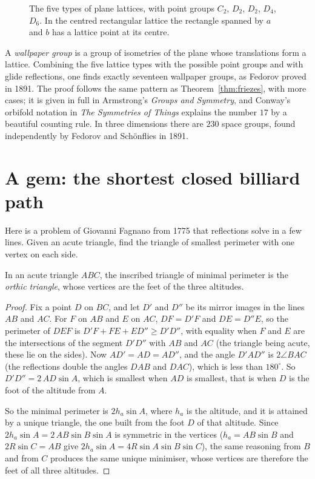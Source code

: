 \begin{figure}[ht]
\centering
{}
\caption{The five types of plane lattices, with point groups $C_2$, $D_2$, $D_2$, $D_4$, $D_6$. In the centred rectangular lattice the
rectangle spanned by $a$ and $b$ has a lattice point at its centre.}
\label{fig:lattices}
\end{figure}

\begin{remark}
A \emph{wallpaper group} is a group of isometries of the plane whose translations form a lattice. Combining the five lattice types with
the possible point groups and with glide reflections, one finds exactly seventeen wallpaper groups, as Fedorov proved in 1891. The proof
follows the same pattern as Theorem~\ref{thm:friezes}, with more cases; it is given in full in Armstrong's \emph{Groups and Symmetry}, and Conway's orbifold notation in \emph{The Symmetries of Things} explains the number $17$ by a beautiful counting rule. In
three dimensions there are $230$ space groups, found independently by Fedorov and Sch\"onflies in 1891.
\end{remark}

\section{A gem: the shortest closed billiard path}

Here is a problem of Giovanni Fagnano from 1775 that reflections solve in a few lines. Given an acute triangle, find the triangle of
smallest perimeter with one vertex on each side.

\begin{theorem}[Fagnano]\label{thm:fagnano}
In an acute triangle $ABC$, the inscribed triangle of minimal perimeter is the \emph{orthic triangle}, whose vertices are the feet of the
three altitudes.
\end{theorem}
\begin{proof}
Fix a point $D$ on $BC$, and let $D'$ and $D''$ be its mirror images in the lines $AB$ and $AC$. For $F$ on $AB$ and $E$ on $AC$,
$DF=D'F$ and $DE=D''E$, so the perimeter of $DEF$ is $D'F+FE+ED''\ge D'D''$, with equality when $F$ and $E$ are the intersections of the
segment $D'D''$ with $AB$ and $AC$ (the triangle being acute, these lie on the sides). Now $AD'=AD=AD''$, and the angle $D'AD''$ is
$2\angle BAC$ (the reflections double the angles $DAB$ and $DAC$), which is less than $180^\circ$. So $D'D''=2\,AD\sin A$, which is smallest
when $AD$ is smallest, that is when $D$ is the foot of the altitude from $A$.

So the minimal perimeter is $2h_a\sin A$, where $h_a$ is the altitude, and it is attained by a unique triangle, the one built from the
foot $D$ of that altitude. Since $2h_a\sin A=2\,AB\sin B\sin A$ is symmetric in the vertices ($h_a=AB\sin B$ and $2R\sin C=AB$ give
$2h_a\sin A=4R\sin A\sin B\sin C$), the same reasoning from $B$ and from $C$ produces the same unique minimiser, whose vertices are therefore
the feet of all three altitudes.
\end{proof}

